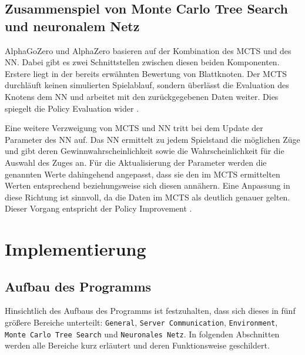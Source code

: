 \documentclass[12pt,a4paper]{article}
\begin{document}
\subsection{Zusammenspiel von Monte Carlo Tree Search und neuronalem Netz}
AlphaGoZero und AlphaZero basieren auf der Kombination des MCTS und des NN. Dabei gibt es zwei Schnittstellen zwischen diesen beiden Komponenten. 
Erstere liegt in der bereits erwähnten Bewertung von Blattknoten. Der MCTS durchläuft keinen simulierten Spielablauf, sondern überlässt die Evaluation des Knotens dem NN und arbeitet mit den zurückgegebenen Daten weiter. Dies spiegelt die Policy Evaluation wider \cite{Silver2017}.

Eine weitere Verzweigung von MCTS und NN tritt bei dem Update der Parameter des NN auf. Das NN ermittelt zu jedem Spielstand die möglichen Züge und gibt deren Gewinnwahrscheinlichkeit sowie die Wahrscheinlichkeit für die Auswahl des Zuges an. Für die Aktualisierung der Parameter werden die genannten Werte dahingehend angepasst, dass sie den im MCTS ermittelten Werten entsprechend beziehungsweise sich diesen annähern. Eine Anpassung in diese Richtung ist sinnvoll, da die Daten im MCTS als deutlich genauer gelten. Dieser Vorgang entspricht der Policy Improvement \cite{Silver2017}.

\newpage
\section{Implementierung}

\subsection{Aufbau des Programms}
Hinsichtlich des Aufbaus des Programms ist festzuhalten, dass sich dieses in fünf größere Bereiche unterteilt: \texttt{General}, \texttt{Server Communication}, \texttt{Environment}, \texttt{Monte Carlo Tree Search} und \texttt{Neuronales Netz}. In folgenden Abschnitten werden alle Bereiche kurz erläutert und deren Funktionsweise geschildert.
\end{document}
